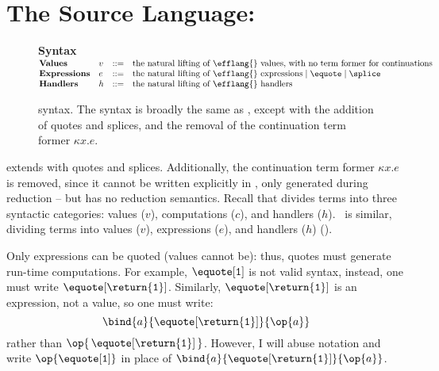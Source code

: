 \section{The Source Language: \texorpdfstring{\sourceLang{}}{Lambda-Op-Quote-Splice}}\label{section:source-lang}
\begin{figure}
\begin{source-desc}
  {\large \textbf{Syntax}} \\

  $\begin{array}{@{}llll}
    \textbf{Values} & v & ::= & \text{the natural lifting of \efflang{} values, with no term former for continuations}\\
    \textbf{Expressions} & e & ::= & \text{the natural lifting of \efflang{} expressions} \mid \equote \mid \splice \\
    \textbf{Handlers} & h & ::= & \text{the natural lifting of \efflang{} handlers}
  \end{array}$
\end{source-desc}
\caption{\sourceLang{} syntax. The syntax is broadly the same as \efflang{}, except with the addition of quotes and splices, and the removal of the continuation term former $\kappa x.e$.}
\label{fig:source-syntax}
\end{figure}
\sourceLang{} extends \efflang{} with quotes and splices. Additionally, the continuation term former $\kappa x. e$ is removed, since it cannot be written explicitly in \efflang{}, only generated during reduction -- but \sourceLang{} has no reduction semantics. Recall that \efflang{} divides terms into three syntactic categories: values ($v$), computations ($c$), and handlers ($h$).\ \sourceLang{} is similar, dividing terms into values ($v$), expressions ($e$), and handlers ($h$) ().

Only expressions can be quoted (values cannot be): thus, quotes must generate run-time computations. For example, $\equote[\texttt{1}]$ is not valid syntax, instead, one must write $\equote[\return{\texttt{1}}]$. Similarly, $\equote[\return{\texttt{1}}]$ is an expression, not a value, so one must write: 
\[\bind{a}{\equote[\return{\texttt{1}}]}{\op{a}}\]
rather than $\op{\, \equote[\return{\texttt{1}}] \,}$. However, I will abuse notation and write $\op{\equote[\texttt{1}]}$ in place of $\bind{a}{\equote[\return{\texttt{1}}]}{\op{a}}$.

